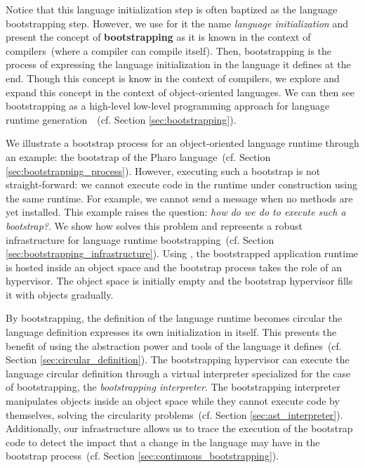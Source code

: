 Notice that this language initialization step is often baptized as the language bootstrapping step. However, we use for it the name \emph{language initialization} and present the concept of \textbf{bootstrapping} as it is known in the context of compilers~(where a compiler can compile itself). Then, bootstrapping is the process of expressing the language initialization in the language it defines at the end. Though this concept is know in the context of compilers, we explore and expand this concept in the context of object-oriented languages. We can then see bootstrapping as a high-level low-level programming approach for  language runtime generation~\cite{Fram09a}~(cf. Section \ref{sec:bootstrapping}).


We illustrate a bootstrap process for an object-oriented language runtime through an example: the bootstrap of the Pharo language~(cf. Section \ref{sec:bootstrapping_process}).
However, executing such a bootstrap is not straight-forward: we cannot execute code in the runtime under construction using the same runtime. For example, we cannot send a message when no methods are yet installed.
This example raises the question: \emph{how do we do to execute such a bootstrap?}. We show how \Vtt solves this problem and represents a robust infrastructure for language runtime bootstrapping~(cf. Section \ref{sec:bootstrapping_infrastructure}). Using \Vtt, the bootstrapped application runtime is hosted inside an object space and the bootstrap process takes the role of an hypervisor. The object space is initially empty and the bootstrap hypervisor fills it with objects gradually. 

By bootstrapping, the definition of the language runtime becomes circular \ie the language definition expresses its own initialization in itself. This presents the benefit of using the abstraction power and tools of the language it defines~(cf. Section \ref{sec:circular_definition}).
The bootstrapping hypervisor can execute the language circular definition through a virtual interpreter specialized for the case of bootstrapping, the \emph{bootstrapping interpreter}. The bootstrapping interpreter manipulates objects inside an object space while they cannot execute code by themselves, solving the circularity problems~(cf. Section \ref{sec:ast_interpreter}). Additionally, our infrastructure allows us to trace the execution of the bootstrap code to detect the impact that a change in the language may have in the bootstrap process~(cf. Section \ref{sec:continuous_bootstrapping}).

